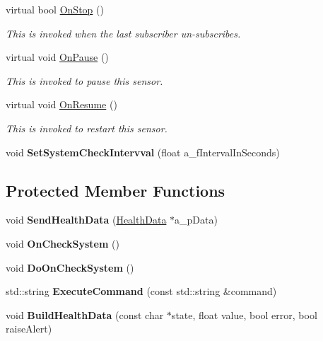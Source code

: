 \begin{DoxyCompactItemize}
virtual bool \hyperlink{class_system_aa1f43da6fe87d124d6b01854b29b1954}{On\+Stop} ()
\begin{DoxyCompactList}\small\item\em This is invoked when the last subscriber un-\/subscribes. \end{DoxyCompactList}\item 
\mbox{\label{class_system_afc1279ad309776fd87a5e86bff4d8b83}} 
virtual void \hyperlink{class_system_afc1279ad309776fd87a5e86bff4d8b83}{On\+Pause} ()
\begin{DoxyCompactList}\small\item\em This is invoked to pause this sensor. \end{DoxyCompactList}\item 
\mbox{\label{class_system_a94409edf401ac878dc040c26f5855d54}} 
virtual void \hyperlink{class_system_a94409edf401ac878dc040c26f5855d54}{On\+Resume} ()
\begin{DoxyCompactList}\small\item\em This is invoked to restart this sensor. \end{DoxyCompactList}\item 
\mbox{\label{class_system_a2df512a3d855c1090a9d4dfcffa2a8e5}} 
void {\bfseries Set\+System\+Check\+Intervval} (float a\+\_\+f\+Interval\+In\+Seconds)
\end{DoxyCompactItemize}
\subsection*{Protected Member Functions}
\begin{DoxyCompactItemize}
\item 
\mbox{\label{class_system_a106ba821e48abf20082e8da7b7eac1ce}} 
void {\bfseries Send\+Health\+Data} (\hyperlink{class_health_data}{Health\+Data} $\ast$a\+\_\+p\+Data)
\item 
\mbox{\label{class_system_a3c73d924038bc5f47d5db5ad45da30d3}} 
void {\bfseries On\+Check\+System} ()
\item 
\mbox{\label{class_system_a34f3ceb7546d6427ead43224c62e37e7}} 
void {\bfseries Do\+On\+Check\+System} ()
\item 
\mbox{\label{class_system_a386ef99f860c490743e125b5fffd8630}} 
std\+::string {\bfseries Execute\+Command} (const std\+::string \&command)
\item 
\mbox{\label{class_system_a3af49b19dea14b475fbb69f55b94b4b6}} 
void {\bfseries Build\+Health\+Data} (const char $\ast$state, float value, bool error, bool raise\+Alert)
\end{DoxyCompactItemize}
